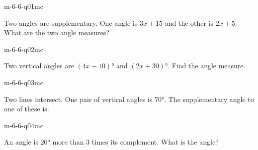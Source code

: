 

\begin{practiceQuestion}{m-6-6-q01}{mc}
\begin{questionText}
Two angles are supplementary. One angle is $3x + 15$ and the other is $2x + 5$. What are the two angle measures?
\end{questionText}
\end{practiceQuestion}

\begin{practiceQuestion}{m-6-6-q02}{mc}
\begin{questionText}
Two vertical angles are $(4x - 10)°$ and $(2x + 30)°$. Find the angle measure.
\end{questionText}
\end{practiceQuestion}

\begin{practiceQuestion}{m-6-6-q03}{mc}
\begin{questionText}
Two lines intersect. One pair of vertical angles is $70°$. The supplementary angle to one of these is:
\end{questionText}
\end{practiceQuestion}

\begin{practiceQuestion}{m-6-6-q04}{mc}
\begin{questionText}
An angle is $20°$ more than $3$ times its complement. What is the angle?
\end{questionText}
\end{practiceQuestion}


